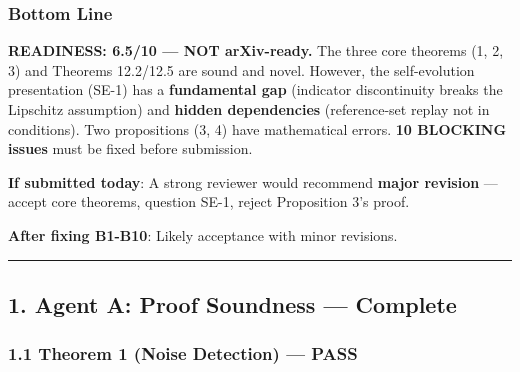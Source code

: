 \documentclass[
  12pt,
]{ctexart}
\begin{document}
\subsubsection{Bottom Line}\label{bottom-line}

\textbf{READINESS: 6.5/10 --- NOT arXiv-ready.} The three core theorems
(1, 2, 3) and Theorems 12.2/12.5 are sound and novel. However, the
self-evolution presentation (SE-1) has a \textbf{fundamental gap}
(indicator discontinuity breaks the Lipschitz assumption) and
\textbf{hidden dependencies} (reference-set replay not in conditions).
Two propositions (3, 4) have mathematical errors. \textbf{10 BLOCKING
issues} must be fixed before submission.

\textbf{If submitted today}: A strong reviewer would recommend
\textbf{major revision} --- accept core theorems, question SE-1, reject
Proposition 3's proof.

\textbf{After fixing B1-B10}: Likely acceptance with minor revisions.

\begin{center}\rule{0.5\linewidth}{0.5pt}\end{center}

\subsection{1. Agent A: Proof Soundness ---
Complete}\label{agent-a-proof-soundness-complete}

\subsubsection{1.1 Theorem 1 (Noise Detection) ---
PASS}\label{theorem-1-noise-detection-pass}
\end{document}
